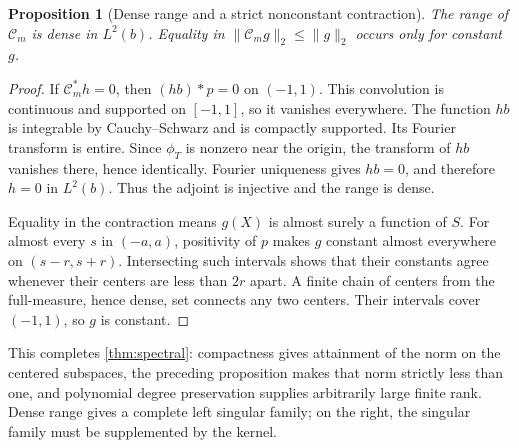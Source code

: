 \documentclass[11pt,a4paper]{article}
\numberwithin{equation}{section}
\newtheorem{proposition}[theorem]{Proposition}
\theoremstyle{definition}\newtheorem{definition}[theorem]{Definition}
\theoremstyle{remark}\newtheorem{remark}[theorem]{Remark}
\newcommand{\calC}{\mathcal C_m}\newcommand{\calP}{\mathcal P}
\newcommand{\norm}[1]{\lVert #1\rVert}
\begin{document}
\begin{proposition}[Dense range and a strict nonconstant contraction]
\label{prop:dense}
The range of $\calC$ is dense in $L^2(b)$. Equality in $\norm{\calC g}_2\le\norm{g}_2$ occurs only for constant $g$.
\end{proposition}
\begin{proof}
If $\calC^*h=0$, then $(hb)*p=0$ on $(-1,1)$. This convolution is continuous and supported on $[-1,1]$, so it vanishes everywhere. The function $hb$ is integrable by Cauchy--Schwarz and is compactly supported. Its Fourier transform is entire. Since $\phi_T$ is nonzero near the origin, the transform of $hb$ vanishes there, hence identically. Fourier uniqueness gives $hb=0$, and therefore $h=0$ in $L^2(b)$. Thus the adjoint is injective and the range is dense.

Equality in the contraction means $g(X)$ is almost surely a function of $S$. For almost every $s$ in $(-a,a)$, positivity of $p$ makes $g$ constant almost everywhere on $(s-r,s+r)$. Intersecting such intervals shows that their constants agree whenever their centers are less than $2r$ apart. A finite chain of centers from the full-measure, hence dense, set connects any two centers. Their intervals cover $(-1,1)$, so $g$ is constant.
\end{proof}
This completes \cref{thm:spectral}: compactness gives attainment of the norm on the centered subspaces, the preceding proposition makes that norm strictly less than one, and polynomial degree preservation supplies arbitrarily large finite rank. Dense range gives a complete left singular family; on the right, the singular family must be supplemented by the kernel.
\end{document}
